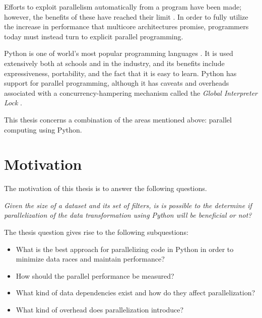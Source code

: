 Efforts to exploit parallelism automatically from a program have been made; however, the benefits of these have reached their
limit \cite[p. 7-12]{mccool_2012_structured_spppfec}. In order to fully utilize the increase in performance that multicore
architectures promise, programmers today must instead turn to explicit parallel programming.

Python is one of world's most popular programming languages \cite{krill_2015_python_psnhilp}. It is used extensively both at schools and
in the industry, and its benefits include expressiveness, portability, and the fact that it is easy to learn. Python has support for
parallel programming, although it has caveats and overheads associated with a concurrency-hampering mechanism called the
\emph{Global Interpreter Lock} \cite{beazley_150745UTC_introduction_aitpc}.

This thesis concerns a combination of the areas mentioned above: parallel computing using Python.


\section{Motivation}
The motivation of this thesis is to answer the following questions.

\emph{Given the size of a dataset and its set of filters, is is possible to the determine 
if parallelization of the data transformation using Python will be beneficial or not?}

The thesis question gives rise to the following subquestions:
\begin{itemize}
    \item What is the best approach for parallelizing code in Python in order to minimize data races and maintain performance?
    \item How should the parallel performance be measured?
    \item What kind of data dependencies exist and how do they affect parallelization?
    \item What kind of overhead does parallelization introduce?
\end{itemize}

